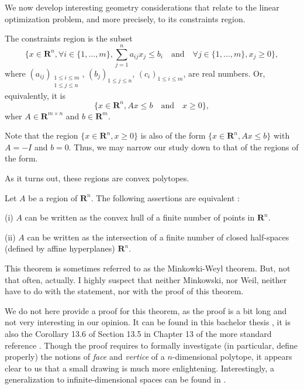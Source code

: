 We now develop interesting geometry considerations that relate to the linear optimization problem, and more precisely, to its constraints region. 

The constraints region is the subset
\[
    \{ x \in \mathbf R^n, \forall i \in \{ 1, ..., m \}, \sum_{j=1}^n a_{ij} x_j \leqslant b_i \quad \textrm{and} \quad \forall j \in \{ 1, ..., m \}, x_j \geqslant 0 \},
\]
where $ (a_{ij})_{\substack{1 \leq i \leq m \\ 1 \leq j \leq n}} $, $ (b_j)_{1 \leq j \leq n} $, $ (c_i)_{1 \leq i \leq m} $, are real numbers. Or, equivalently, it is
\[
    \{ x \in \mathbf R^n, Ax \leqslant b \quad \textrm{and} \quad x \geqslant 0 \},
\]
wher $ A \in \mathbf R^{m \times n} $ and $ b \in \mathbf R^m $.

Note that the region $ \{ x \in \mathbf R^n, x \geqslant 0 \} $ is also of the form $ \{ x \in \mathbf R^n, Ax \leqslant b \} $ with $ A = -I $ and $ b = 0 $. Thus, we may narrow our study down to that of the regions of the form.

As it turns out, these regions are convex polytopes.

\begin{theorem}\label{thm:polytopes-are-intersections-of-closed-halfspaces}
    Let $ A $ be a region of $ \mathbf R^n $. The following assertions are equivalent : 
    
    (i) $ A $ can be written as the convex hull of a finite number of points in $ \mathbf R^n $.

    (ii) $ A $ can be written as the intersection of a finite number of closed half-spaces (defined by affine hyperplanes) $ \mathbf R^n $.
\end{theorem}

This theorem is sometimes referred to as the Minkowki-Weyl theorem. But, not that often, actually. I highly suspect that neither Minkowski, nor Weil, neither have to do with the statement, nor with the proof of this theorem. 

We do not here provide a proof for this theorem, as the proof is a bit long and not very interesting in our opinion. It can be found in this bachelor thesis \cite{chappell2019}, it is also the Corollary 13.6 of Section 13.5 in Chapter 13 of the more standard reference \cite{jantosciak1979}. Though the proof requires to formally investigate (in particular, define properly) the notions of \textit{face} and \textit{vertice} of a $ n $-dimensional polytope, it appears clear to us that a small drawing is much more enlightening. Interestingly, a generalization to infinite-dimensional spaces can be found in \cite{LeRomer2023}.

